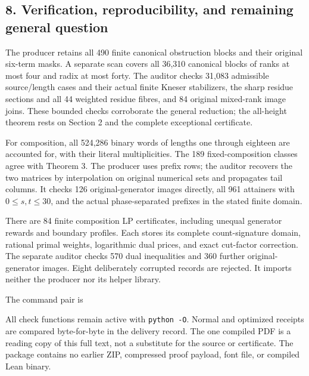 \subsection{8. Verification, reproducibility, and remaining general question}\label{eporig:verification-reproducibility-and-remaining-general-question}

The producer retains all 490 finite canonical obstruction blocks and their original six-term masks. A separate scan covers all 36,310 canonical blocks of ranks at most four and radix at most forty. The auditor checks 31,083 admissible source/length cases and their actual finite Kneser stabilizers, the sharp residue sections and all 44 weighted residue fibres, and 84 original mixed-rank image joins. These bounded checks corroborate the general reduction; the all-height theorem rests on Section 2 and the complete exceptional certificate.

For composition, all 524,286 binary words of lengths one through eighteen are accounted for, with their literal multiplicities. The 189 fixed-composition classes agree with Theorem 3. The producer uses prefix rows; the auditor recovers the two matrices by interpolation on original numerical sets and propagates tail columns. It checks 126 original-generator images directly, all 961 attainers with \(0\le s,t\le30\), and the actual phase-separated prefixes in the stated finite domain.

There are 84 finite composition LP certificates, including unequal generator rewards and boundary profiles. Each stores its complete count-signature domain, rational primal weights, logarithmic dual prices, and exact cut-factor correction. The separate auditor checks 570 dual inequalities and 360 further original-generator images. Eight deliberately corrupted records are rejected. It imports neither the producer nor its helper library.

The command pair is

\begin{Shaded}
\begin{Highlighting}[]
\end{Highlighting}
\end{Shaded}

All check functions remain active with \texttt{python\ -O}. Normal and optimized receipts are compared byte-for-byte in the delivery record. The one compiled PDF is a reading copy of this full text, not a substitute for the source or certificate. The package contains no earlier ZIP, compressed proof payload, font file, or compiled Lean binary.

